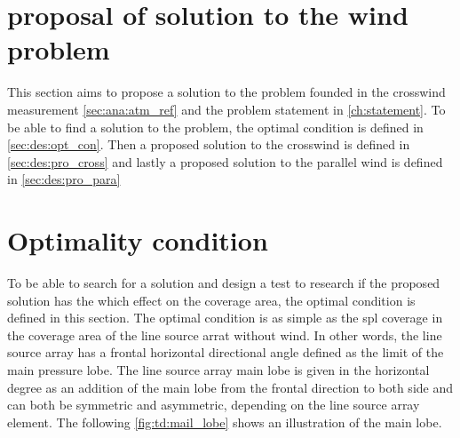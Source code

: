 \section{proposal of solution to the wind problem}\label{sec:td:pro_sol_pro}

This section aims to propose a solution to the problem founded in the crosswind measurement \autoref{sec:ana:atm_ref} and the problem statement in \autoref{ch:statement}. To be able to find a solution to the problem, the optimal condition is defined in \autoref{sec:des:opt_con}. Then a proposed solution to the crosswind is defined in \autoref{sec:des:pro_cross} and lastly a proposed solution to the parallel wind is defined in \autoref{sec:des:pro_para}


\section{Optimality condition}\label{sec:des:opt_con}

To be able to search for a solution and design a test to research if the proposed solution has the which effect on the coverage area, the optimal condition is defined in this section. The optimal condition is as simple as the \gls{spl} coverage in the coverage area of the line source arrat without wind. In other words, the line source array has a frontal horizontal directional angle defined as the  limit of the main pressure lobe. The line source array main lobe is given in the horizontal degree as an addition of the main lobe from the frontal direction to both side and can both be symmetric and asymmetric, depending on the line source array element. The following \autoref{fig:td:mail_lobe} shows an illustration of the main lobe. 


